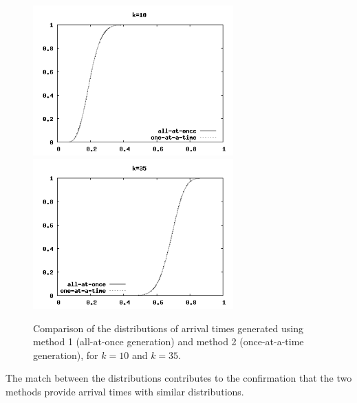 \documentclass[12pt]{article} %
\begin{document}
\begin{figure}[ht]
\centering
\includegraphics[width=7.7cm]{compOneAll10}
\includegraphics[width=7.7cm]{compOneAll35}
\vspace{-4mm}
\caption{Comparison of the distributions of arrival times generated using method 1 (all-at-once generation) and method 2 (once-at-a-time generation), for $k=10$ and $k=35$. }
\label{fig:compOneAll}
\vspace{-1mm}
\end{figure}
The match between the distributions contributes to the confirmation that the two methods provide arrival times with similar distributions.
%
%
\end{document}
